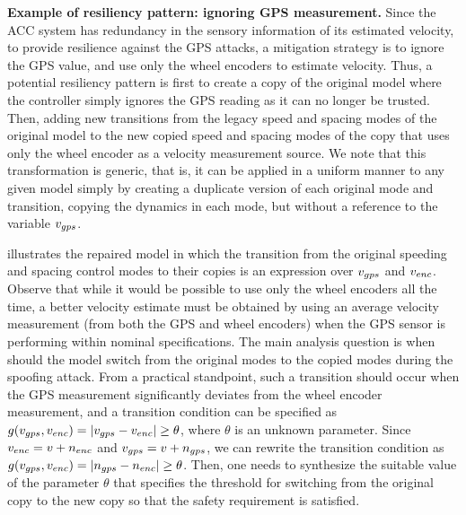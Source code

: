 \vspace{0.5em}
\noindent
{\bf Example of resiliency pattern: ignoring GPS measurement.}
Since the ACC system has redundancy in the sensory information of its estimated velocity, to provide resilience against the GPS attacks, a mitigation strategy is to ignore the GPS value, and use only the wheel encoders to estimate velocity. 
%
Thus, a potential resiliency pattern is first to create a copy of the original model where the controller simply ignores the GPS reading as it can no longer be trusted. 
%
Then, adding new transitions from the legacy speed and spacing modes of the original model to the new copied speed and spacing modes of the copy that uses only the wheel encoder as a velocity measurement source. We note that this transformation is generic, that is, it can be applied in a uniform manner to any given model simply by creating a duplicate version of each original mode and transition, copying the dynamics in each mode, but without a reference to the variable $v_{gps}$. 

 illustrates the repaired model in which the transition from the original speeding and spacing control modes to their copies is an expression over $v_{gps}$ and $v_{enc}$. 
%
Observe that while it would be possible to use only the wheel encoders all the time, a better velocity estimate must be obtained by using an average velocity measurement (from both the GPS and wheel encoders) when the GPS sensor is performing within nominal specifications. The main analysis question is when should the model switch from the original modes to the copied modes during the spoofing attack. %
%
From a practical standpoint, such a transition should occur when the GPS measurement significantly deviates from the wheel encoder measurement, and a transition condition can be specified as $g(v_{gps},v_{enc}) = |v_{gps} -v_{enc}| \geq \theta$, where $\theta$ is an unknown parameter. 
%
Since $v_{enc} = v + n_{enc}$ and $v_{gps} = v+n_{gps}$, we can rewrite the transition condition as $g(v_{gps},v_{enc}) = |n_{gps} -n_{enc}| \geq \theta$.
%
Then, one needs to synthesize the suitable value of the parameter $\theta$ that specifies the threshold for switching from the original copy to the new copy so that the safety requirement is satisfied.



